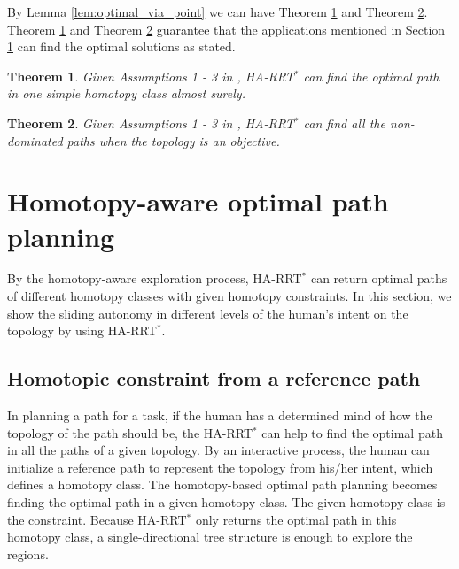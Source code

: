 \documentclass[letterpaper, 10 pt, conference]{ieeeconf}
\newtheorem{thm}{Theorem}
\begin{document}
By Lemma \ref{lem:optimal_via_point} we can have Theorem \ref{thm:constrained_optimality} and Theorem \ref{thm:homotopy_pref:optimal}.
Theorem \ref{thm:constrained_optimality} and Theorem \ref{thm:homotopy_pref:optimal} guarantee that the applications mentioned in Section \ref{sec:application} can find the optimal solutions as stated.

\begin{thm}
	\label{thm:constrained_optimality}
	Given Assumptions 1 - 3 in \cite{Karaman-RSS-10},
	HA-RRT$^{*}$ can find the optimal path in one simple homotopy class almost surely.
\end{thm}

\begin{thm}
	\label{thm:homotopy_pref:optimal}
	Given Assumptions 1 - 3 in \cite{Karaman-RSS-10}, 
	HA-RRT$^{*}$ can find all the non-dominated paths when the topology is an objective.
\end{thm}


\section{Homotopy-aware optimal path planning}
\label{sec:application}

By the homotopy-aware exploration process, HA-RRT$^{*}$ can return optimal paths of different homotopy classes with given homotopy constraints.
In this section, we show the sliding autonomy in different levels of the human's intent on the topology by using HA-RRT$^{*}$.

\subsection{Homotopic constraint from a reference path}
\label{sec:string_constraint}

In planning a path for a task, if the human has a determined mind of how the topology of the path should be, the HA-RRT$^{*}$ can help to find the optimal path in all the paths of a given topology.
By an interactive process, the human can initialize a reference path to represent the topology from his/her intent, which defines a homotopy class.
The homotopy-based optimal path planning becomes finding the optimal path in a given homotopy class.
The given homotopy class is the constraint.
Because HA-RRT$^{*}$ only returns the optimal path in this homotopy class, a single-directional tree structure is enough to explore the regions.
\end{document}
